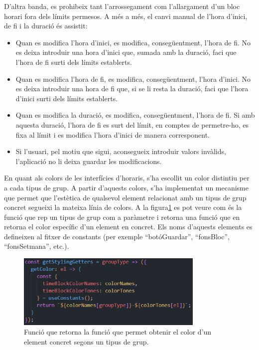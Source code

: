 \documentclass[a4paper,12pt]{ThesisStyle}
\begin{document}
D'altra banda, es prohibeix tant l'arrossegament com l'allargament d'un bloc horari fora dels límits permesos. A més a més, el canvi manual de l'hora d'inici, de fi i la duració és assistit:
\begin{itemize}
  \item Quan es modifica l'hora d'inici, es modifica, consegüentment, l'hora de fi. No es deixa introduir una hora d'inici que, sumada amb la duració, faci que l'hora de fi surti dels límits establerts.
  \item Quan es modifica l'hora de fi, es modifica, consegüentment, l'hora d'inici. No es deixa introduir una hora de fi que, si se li resta la duració, faci que l'hora d'inici surti dels límits establerts.
  \item Quan es modifica la duració, es modifica, consegüentment, l'hora de fi. Si amb aquesta duració, l'hora de fi es surt del límit, en comptes de permetre-ho, es fixa al límit i es modifica l'hora d'inici de manera corresponent.
  \item Si l'usuari, pel motiu que sigui, aconsegueix introduir valors invàlids, l'aplicació no li deixa guardar les modificacions.
\end{itemize}

En quant als colors de les interfícies d'horaris, s'ha escollit un color distintiu per a cada tipus de grup. A partir d'aquests colors, s'ha implementat un mecanisme que permet que l'estètica de qualsevol element relacionat amb un tipus de grup concret segueixi la mateixa línia de colors. A la figura\ref{img:getColor} es pot veure com és la funció que rep un tipus de grup com a paràmetre i retorna una funció que en retorna el color específic d'un element en concret. Els noms d'aquests elements es defineixen al fitxer de constants (per exemple ``botóGuardar'', ``fonsBloc'', ``fonsSetmana'', etc.).

\begin{figure}[H]
  \centering
  \includegraphics[width=0.8\textwidth]{assets/code/usabilitat/getColor.png}
  \caption{\label{img:getColor} Funció que retorna la funció que permet obtenir el color d'un element concret segons un tipus de grup.}
\end{figure}
\end{document}
